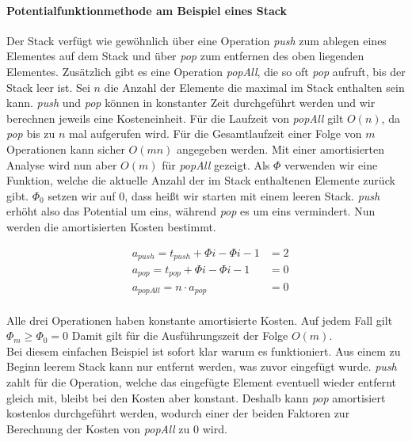 \documentclass[a4paper,12pt]{article}
\begin{document}
\paragraph{Potentialfunktionmethode am Beispiel eines Stack} 
Der Stack verfügt wie gewöhnlich über eine Operation \textit{push} zum ablegen eines Elementes auf dem Stack und über \textit{pop} zum entfernen des oben liegenden Elementes. Zusätzlich gibt es eine Operation \textit{popAll}, die so oft \textit{pop} aufruft, bis der Stack leer ist. Sei $n$ die Anzahl der Elemente die maximal im Stack enthalten sein kann. \textit{push} und \textit{pop} können in konstanter Zeit durchgeführt werden und wir berechnen jeweils eine Kosteneinheit. Für die Laufzeit von \textit{popAll} gilt $O(n)$, da \textit{pop} bis zu $n$ mal aufgerufen wird. Für die Gesamtlaufzeit einer Folge von $m$ Operationen kann sicher $O(mn)$ angegeben werden. Mit einer amortisierten Analyse wird nun aber $O(m)$ für \textit{popAll} gezeigt. Als $\Phi$ verwenden wir eine Funktion, welche die aktuelle Anzahl der im Stack enthaltenen Elemente zurück gibt. $\Phi_0$ setzen wir auf $0$, dass heißt wir starten mit einem leeren Stack. \textit{push} erhöht also das Potential um eins, während \textit{pop} es um eins vermindert. Nun werden die amortisierten Kosten bestimmt. 

\begin{align*}   
&a_{\mathit{push}} = t_{\mathit{push}} + \Phi{i} - \Phi{i-1}  &= 2\\
&a_{\mathit{pop}} = t_{\mathit{pop}} + \Phi{i} - \Phi{i-1}  &= 0\\
&a_{\mathit{popAll}} = n \cdot a_{\mathit{pop}} &= 0
\end{align*}\\
Alle drei Operationen haben konstante amortisierte Kosten. Auf jedem Fall gilt $ \Phi_m \geq  \Phi_0 = 0 $ Damit gilt für die Ausführungszeit der Folge $O(m)$. \\
Bei diesem einfachen Beispiel ist sofort klar warum es funktioniert. Aus einem zu Beginn leerem Stack kann nur entfernt werden, was zuvor eingefügt wurde. \textit{push} zahlt für die Operation, welche das eingefügte Element eventuell wieder entfernt gleich mit, bleibt bei den Kosten aber konstant. Deshalb kann \textit{pop} amortisiert kostenlos durchgeführt werden, wodurch einer der beiden Faktoren zur Berechnung der Kosten von \textit{popAll} zu $0$ wird.  


\newpage


\end{document}
